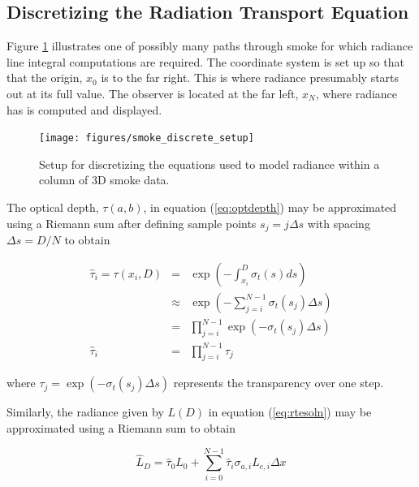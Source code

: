 \subsection{Discretizing the Radiation Transport Equation}
\newcommand{\htau}[1]{\hat{\tau}_{#1}}
\newcommand{\sigai}[1]{\sigma_{a,#1}}
\newcommand{\Lei}[1]{L_{e,#1}}

Figure \ref{fig:smokediscretesetup} illustrates one of possibly many paths through smoke for which radiance line integral computations are required.  The coordinate system is set up so that that the origin, $x_0$ is to the far right. This is where radiance presumably starts out at its full value.  The observer is located at the far left, $x_N$, where radiance has is computed and displayed.

\begin{figure}[\figoptions]
\begin{center}
\texttt{[image: figures/smoke\_discrete\_setup]}
\end{center}
\caption {Setup for discretizing the equations used to model
radiance within a column of 3D smoke data.}
\label{fig:smokediscretesetup}
\end{figure}

The optical depth, $\tau(a,b)$, in equation (\ref{eq:optdepth}) may be approximated using a Riemann sum  after defining sample points $s_j=j\Delta s$ with spacing $\Delta s=D/N$ to obtain

\begin{eqnarray}
\nonumber
\hat{\tau}_i=\tau(x_i,D)&=&\exp\left(-\int_{x_i}^D\sigma_t(s)ds\right)\\
\nonumber
&\approx&\exp\left(-\sum_{j=i}^{N-1}\sigma_t(s_j)\Delta s\right)\\
\nonumber
&=&\prod_{j=i}^{N-1}\exp\left(-\sigma_t(s_j)\Delta s\right)\\
\label{eq:tauhat_discrete}
\hat{\tau}_i&=&\prod_{j=i}^{N-1}\tau_j
\end{eqnarray}

where $\tau_j=\exp\left(-\sigma_t(s_j)\Delta s\right)$ represents the transparency over one step. 

Similarly, the radiance given by $L(D)$ in equation (\ref{eq:rtesoln}) may be approximated using a Riemann sum to obtain

\begin{equation}
\label{eq:discrete_rte}
\hat{L}_D = \htau{0}L_0 +
\sum_{i=0}^{N-1}\htau{i}\sigai{i}\Lei{i}\Delta x
\end{equation}

